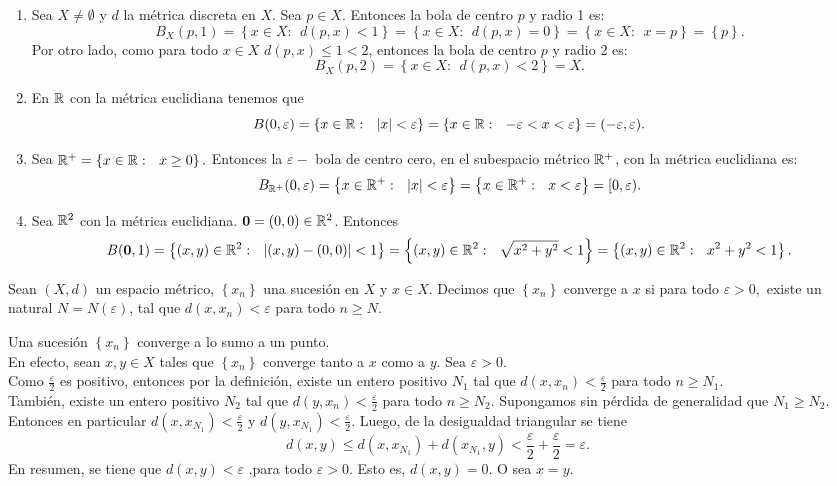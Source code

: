     \begin{example}
    \begin{enumerate}
        \item Sea $X\neq \emptyset$ y $d$ la métrica discreta en $X$. Sea $p\in X$. Entonces la bola de centro $p$ y radio 1 es:
        \[B_X(p,1)=\left\{x\in X:\ \ d(p,x)<1 \right\}=\left\{x\in X:\ \ d(p,x)=0 \right\}=\left\{x\in X:\ \ x=p \right\}=\left\{p \right\}.\]
        Por otro lado, como para todo $x\in X$ $d(p,x)\leq 1<2$, entonces la bola de centro $p$ y radio 2 es:
        \[B_X(p,2)=\left\{x\in X:\ \ d(p,x)<2 \right\}=X.\]
        \item En $\mathbb{R}$ con la métrica euclidiana  tenemos que
        \[B(0, \varepsilon)=\left\{x\in \mathbb{R}:\ \ |x|<\varepsilon \right\}=\left\{x\in \mathbb{R}:\ \ -\varepsilon <x < \varepsilon \right\}=(-\varepsilon, \varepsilon).\]
        \item Sea $ \mathbb{R}^+= \left\{ x\in \mathbb{R}: \ \ x\geq 0 \right\}.$ Entonces la $\varepsilon-$ bola de centro cero, en el subespacio métrico $\mathbb{R}^+$, con la métrica euclidiana es:
        \[B_{\R^+}(0, \varepsilon)=\left\{x\in \R^+:\ \ |x|<\varepsilon \right\}=\left\{x\in \R^+:\ \ x < \varepsilon \right\}=[0, \varepsilon).\]
        \item Sea $\mathbb{R}^2$ con la métrica euclidiana. $\textbf{0}=(0,0)\in \mathbb{R}^2$. Entonces
        \[B(\textbf{0}, 1)=\left\{(x,y) \in \R^2:\ \ |(x,y)-(0,0)|<1 \right\}=\left\{(x,y) \in \R^2:\ \ \sqrt{x^2+y^2}<1 \right\}=\left\{(x,y) \in \R^2:\ \ x^2+y^2<1 \right\}.\]
    \end{enumerate}
    \end{example}
    \begin{definicion}
        Sean $(X,d)$ un espacio métrico, $\left\{ x_n \right\}$ una sucesión en $X$ y $x\in X$. Decimos que $\left\{ x_n \right\}$ converge a $x$ si para todo $\varepsilon >0,$ existe un natural $N=N(\varepsilon)$, tal que $d(x, x_n)<\varepsilon$ para todo $n\geq N$.
    \end{definicion}
   
    \begin{remark}
    Una sucesión $\left\{ x_n \right\}$ converge a lo sumo a un punto. \\
    En efecto, sean $x,y\in X$ tales que  $\left\{ x_n \right\}$ converge tanto a $x$ como a $y$. Sea $\varepsilon >0$. \\
    Como $\frac{\varepsilon}2$ es positivo, entonces por la definición, existe un entero positivo $N_1$ tal que $d(x, x_n)<\frac{\varepsilon}2$ para todo $n\geq N_1$.\\
    También, existe un entero positivo $N_2$ tal que $d(y, x_n)<\frac{\varepsilon}2$ para todo $n\geq N_2$. Supongamos sin pérdida de generalidad que $N_1 \geq N_2$. Entonces en particular
    $d(x, x_{N_1})<\frac{\varepsilon}2$ y $d(y, x_{N_1})<\frac{\varepsilon}2$. Luego, de la desigualdad triangular se tiene
    \[d(x,y)\leq d(x,x_{N_1})+d(x_{N_1},y)<\frac{\varepsilon}2+\frac{\varepsilon}2={\varepsilon}.\]
    En resumen, se tiene que $d(x,y)<\varepsilon$ ,para todo $\varepsilon>0$. Esto es, $d(x,y)=0$. O sea $x=y$.
    \end{remark}

